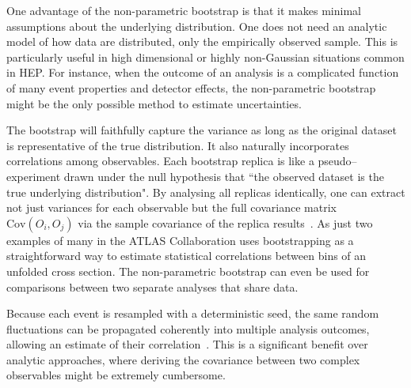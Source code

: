             One advantage of the non-parametric bootstrap is that it makes minimal assumptions about the underlying distribution.
            One does not need an analytic model of how data are distributed, only the empirically observed sample.
            This is particularly useful in high dimensional or highly non-Gaussian situations common in HEP.
            For instance, when the outcome of an analysis is a complicated function of many event properties and detector effects, the non-parametric bootstrap might be the only possible method to estimate uncertainties.
            
            The bootstrap will faithfully capture the variance as long as the original dataset is representative of the true distribution.
            It also naturally incorporates correlations among observables.
            Each bootstrap replica is like a pseudo--experiment drawn under the null hypothesis that ``the observed dataset is the true underlying distribution".
            By analysing all replicas identically, one can extract not just variances for each observable but the full covariance matrix $\mathrm{Cov}(O_i, O_j)$ via the sample covariance of the replica results~\cite{noauthor_evaluating_2021}.
            As just two examples of many in \cite{Aad2024Underlying-eventDetector, noauthor_studies_2021} the ATLAS Collaboration uses bootstrapping as a straightforward way to estimate statistical correlations between bins of an unfolded cross section.
            The non-parametric bootstrap can even be used for comparisons between two separate analyses that share data.
            
            Because each event is resampled with a deterministic seed, the same random fluctuations can be propagated coherently into multiple analysis outcomes, allowing an estimate of their correlation~\cite{LecuyerStochasticMethods}.
            This is a significant benefit over analytic approaches, where deriving the covariance between two complex observables might be extremely cumbersome.

